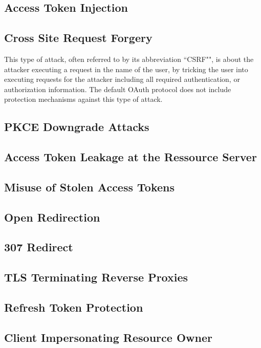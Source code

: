 \documentclass[
    fontsize=12pt,
    headings=small,
    parskip=half,           %
    bibliography=totoc,
    numbers=noenddot,       %
    open=any,               %
    ]{scrreprt}
\begin{document}
\subsection{Access Token Injection}

\subsection{Cross Site Request Forgery}
This type of attack, often referred to by its abbreviation ``CSRF"", is about the attacker executing a request in the name of the user, by tricking the user into executing requests for the attacker including all required authentication, or authorization information. The default OAuth protocol does not include protection mechanisms against this type of attack. 

\subsection{PKCE Downgrade Attacks}

\subsection{Access Token Leakage at the Ressource Server}

\subsection{Misuse of Stolen Access Tokens}

\subsection{Open Redirection}

\subsection{307 Redirect}

\subsection{TLS Terminating Reverse Proxies}

\subsection{Refresh Token Protection}

\subsection{Client Impersonating Resource Owner}
\end{document}
